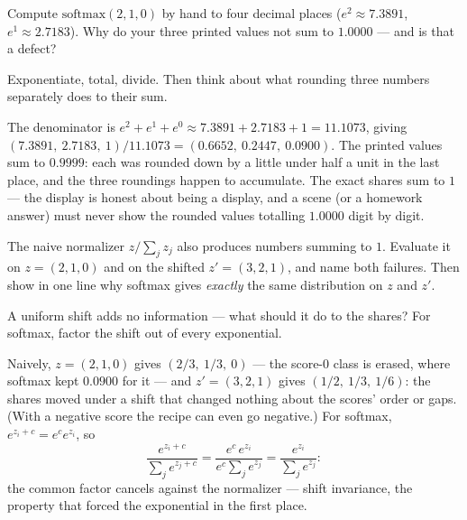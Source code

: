 \begin{problem}
Compute $\mathrm{softmax}(2, 1, 0)$ by hand to four decimal places
($e^2 \approx 7.3891$, $e^1 \approx 2.7183$). Why do your three
printed values not sum to $1.0000$ — and is that a defect?
\begin{hint}
Exponentiate, total, divide. Then think about what rounding three
numbers separately does to their sum.
\end{hint}
\begin{solution}
The denominator is $e^2 + e^1 + e^0 \approx 7.3891 + 2.7183 + 1
= 11.1073$, giving
$(7.3891,\ 2.7183,\ 1)/11.1073 = (0.6652,\ 0.2447,\ 0.0900)$. The
printed values sum to $0.9999$: each was rounded down by a little
under half a unit in the last place, and the three roundings happen
to accumulate. The exact shares sum to $1$ — the display is honest
about being a display, and a scene (or a homework answer) must never
show the rounded values totalling $1.0000$ digit by digit.
\end{solution}
\end{problem}

\begin{problem}
The naive normalizer $z / \sum_j z_j$ also produces numbers summing
to $1$. Evaluate it on $z = (2, 1, 0)$ and on the shifted
$z' = (3, 2, 1)$, and name both failures. Then show in one line why
softmax gives \emph{exactly} the same distribution on $z$ and $z'$.
\begin{hint}
A uniform shift adds no information — what should it do to the
shares? For softmax, factor the shift out of every exponential.
\end{hint}
\begin{solution}
Naively, $z = (2, 1, 0)$ gives $(2/3,\ 1/3,\ 0)$ — the score-$0$
class is erased, where softmax kept $0.0900$ for it — and
$z' = (3, 2, 1)$ gives $(1/2,\ 1/3,\ 1/6)$: the shares moved under a
shift that changed nothing about the scores' order or gaps. (With a
negative score the recipe can even go negative.) For softmax,
$e^{z_i + c} = e^c e^{z_i}$, so
\[
  \frac{e^{z_i + c}}{\sum_j e^{z_j + c}}
  = \frac{e^c\, e^{z_i}}{e^c \sum_j e^{z_j}}
  = \frac{e^{z_i}}{\sum_j e^{z_j}} :
\]
the common factor cancels against the normalizer — shift invariance,
the property that forced the exponential in the first place.
\end{solution}
\end{problem}

